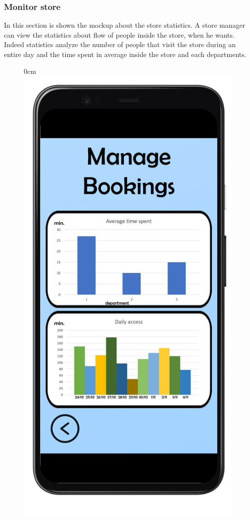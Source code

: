 \documentclass{article}
\begin{document}
		\newpage
		\newpage
		
		\subsubsection{Monitor store}
		
		In this section is shown the mockup about the store statistics. A store manager can view the statistics about flow of people inside the store, when he wants. Indeed statistics analyze the number of people that visit the store during an entire day and the time spent in average inside the store and each departments.
		\bigskip
		\bigskip
		\begin{figure}[!h]
			\begin{adjustwidth} {0cm}{}
				\centering
				\includegraphics[scale=0.17]{../Mockups/Statistics.png}\\

\end{adjustwidth}
\end{figure}
\end{document}

